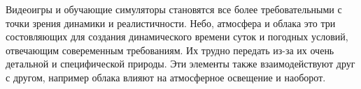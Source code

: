 \Introduction

Видеоигры и обучающие симуляторы становятся все более требовательными с точки зрения динамики и реалистичности.
Небо, атмосфера и облака это три состовляющих для создания динамического времени суток
и погодных условий, отвечающим совеременным требованиям. Их трудно передать из-за их очень
детальной и специфической природы. Эти элементы также взаимодействуют друг с другом, например облака влияют
на атмосферное освещение и наоборот.
